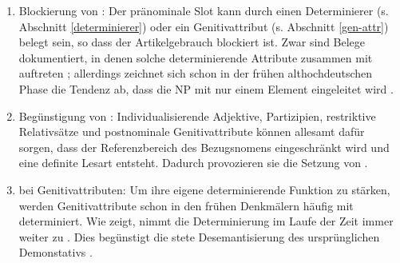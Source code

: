 \begin{enumerate}
\item Blockierung von : Der pränominale Slot kann durch einen Determinierer (s. Abschnitt \ref{determinierer}) oder ein Genitivattribut (s. Abschnitt \ref{gen-attr}) belegt sein, so dass der Artikelgebrauch blockiert ist. Zwar sind Belege dokumentiert, in denen solche determinierende Attribute zusammen  mit  auftreten \parencite[vgl. z.B. die Belegsammlungen in][60--78]{Graf1905};  allerdings zeichnet sich schon in der frühen althochdeutschen Phase die Tendenz ab, dass die NP mit nur einem Element eingeleitet wird \parencite{Oubouzar1997}.
\item Begünstigung von : Individualisierende Adjektive, Partizipien, restriktive Relativsätze und postnominale Genitivattribute können allesamt dafür sorgen, dass der Referenzbereich des Bezugsnomens eingeschränkt wird und eine definite Lesart entsteht. Dadurch provozieren sie die Setzung von  \parencite[24f.]{Schrodt2004}.
\item {} bei Genitivattributen: Um ihre eigene determinierende Funktion zu stärken, werden Genitivattribute schon in den frühen Denkmälern häufig mit  determiniert. Wie \parencite{Oubouzar1989, Oubouzar1992, Oubouzar1997} zeigt, nimmt die Determinierung im Laufe der Zeit immer weiter zu \parencite[185]{Leiss2000}. Dies begünstigt die stete Desemantisierung des ursprünglichen Demonstativs \parencite{Szczepaniak2015}.
\end{enumerate}


